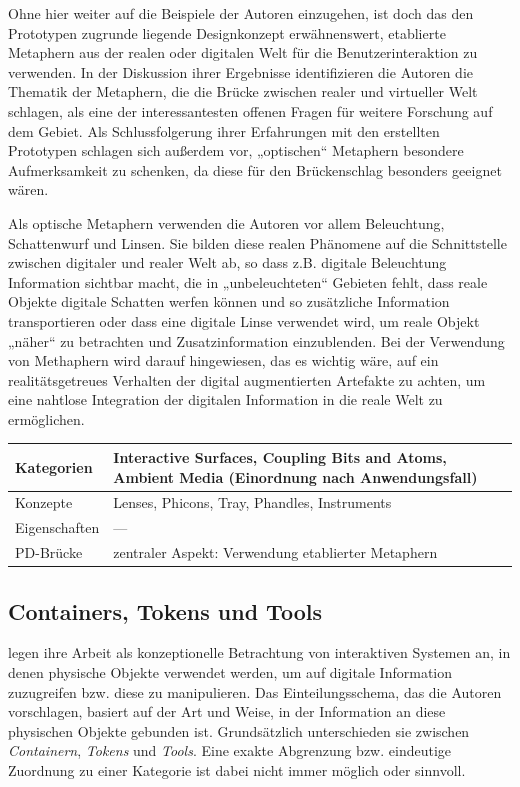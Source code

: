 Ohne hier weiter auf die Beispiele der Autoren einzugehen, ist doch das den Prototypen zugrunde liegende Designkonzept erwähnenswert, etablierte Metaphern aus der realen oder digitalen Welt für die Benutzerinteraktion zu verwenden. In der Diskussion ihrer Ergebnisse identifizieren die Autoren die Thematik der Metaphern, die die Brücke zwischen realer und virtueller Welt schlagen, als eine der interessantesten offenen Fragen für weitere Forschung auf dem Gebiet. Als Schlussfolgerung ihrer Erfahrungen mit den erstellten Prototypen schlagen sich außerdem vor, „optischen“ Metaphern besondere Aufmerksamkeit zu schenken, da diese für den Brückenschlag besonders geeignet wären. 

Als optische Metaphern verwenden die Autoren vor allem Beleuchtung, Schattenwurf und Linsen. Sie bilden diese realen Phänomene auf die Schnittstelle zwischen digitaler und realer Welt ab, so dass z.B. digitale Beleuchtung Information sichtbar macht, die in „unbeleuchteten“ Gebieten fehlt, dass reale Objekte digitale Schatten werfen können und so zusätzliche Information transportieren oder dass eine digitale Linse verwendet wird, um reale Objekt „näher“ zu betrachten und Zusatzinformation einzublenden. Bei der Verwendung von Methaphern wird darauf hingewiesen, das es wichtig wäre, auf ein realitätsgetreues Verhalten der digital augmentierten Artefakte zu achten, um eine nahtlose Integration der digitalen Information in die reale Welt zu ermöglichen.
\\[1em]
\begin{tabular}{| p{3cm} | p{10cm} |}
  \hline
  Kategorien & Interactive Surfaces, Coupling Bits and Atoms, Ambient Media (Einordnung nach Anwendungsfall) \\ \hline
  Konzepte & Lenses, Phicons, Tray, Phandles, Instruments \\ \hline
  Eigenschaften & --- \\ \hline
  PD-Brücke & zentraler Aspekt: Verwendung etablierter Metaphern \\ \hline
\end{tabular} 


\subsection{Containers, Tokens und Tools} %
\label{sub:containers_tokens_tools}

\citet{Holmquist99} legen ihre Arbeit als konzeptionelle Betrachtung von interaktiven Systemen an, in denen physische Objekte verwendet werden, um auf digitale Information zuzugreifen bzw. diese zu manipulieren. Das Einteilungsschema, das die Autoren vorschlagen, basiert auf der Art und Weise, in der Information an diese physischen Objekte gebunden ist. Grundsätzlich unterschieden sie zwischen \emph{Containern}, \emph{Tokens} und \emph{Tools}. Eine exakte Abgrenzung bzw. eindeutige Zuordnung zu einer Kategorie ist dabei nicht immer möglich oder sinnvoll.

